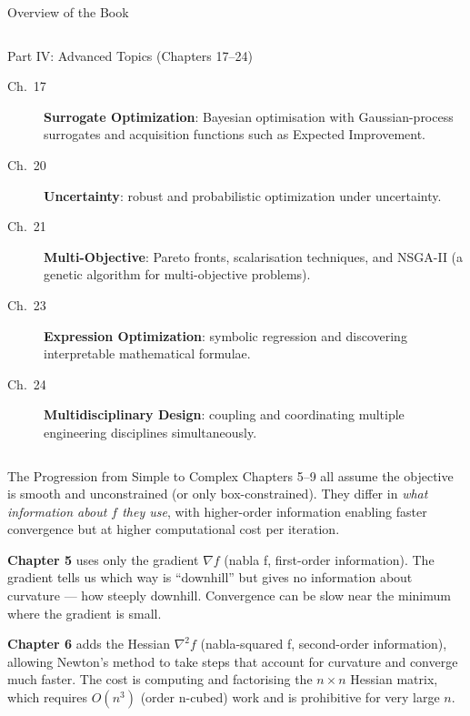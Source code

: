 \documentclass[aspectratio=169,10pt]{beamer}
\newcommand{\grad}{\nabla}
\newcommand{\hess}{\nabla^2}
\begin{document}
\begin{frame}[allowframebreaks]{Overview of the Book}
\begin{columns}[T]
      \begin{block}{Part IV: Advanced Topics (Chapters 17--24)}
        \begin{description}
          \item[Ch.\ 17] \textbf{Surrogate Optimization}: Bayesian optimisation
            with Gaussian-process surrogates and acquisition functions such as
            Expected Improvement.
          \item[Ch.\ 20] \textbf{Uncertainty}: robust and probabilistic
            optimization under uncertainty.
          \item[Ch.\ 21] \textbf{Multi-Objective}: Pareto fronts,
            scalarisation techniques, and NSGA-II (a genetic algorithm for
            multi-objective problems).
          \item[Ch.\ 23] \textbf{Expression Optimization}: symbolic regression
            and discovering interpretable mathematical formulae.
          \item[Ch.\ 24] \textbf{Multidisciplinary Design}: coupling and
            coordinating multiple engineering disciplines simultaneously.
        \end{description}
      \end{block}
  \end{columns}

  \framebreak

  \begin{columns}[T]
      \begin{block}{The Progression from Simple to Complex}
        Chapters 5--9 all assume the objective is smooth and unconstrained
        (or only box-constrained).  They differ in \emph{what information
        about $f$ they use}, with higher-order information enabling faster
        convergence but at higher computational cost per iteration.

        \medskip
        \textbf{Chapter 5} uses only the gradient $\grad f$ (nabla f,
        first-order information).  The gradient tells us which way is
        ``downhill'' but gives no information about curvature --- how steeply
        downhill.  Convergence can be slow near the minimum where the gradient
        is small.

        \medskip
        \textbf{Chapter 6} adds the Hessian $\hess f$ (nabla-squared f,
        second-order information), allowing Newton's method to take steps
        that account for curvature and converge much faster.  The cost is
        computing and factorising the $n \times n$ Hessian matrix, which
        requires $O(n^3)$ (order n-cubed) work and is prohibitive for very
        large $n$.


\end{block}
\end{columns}
\end{frame}
\end{document}
